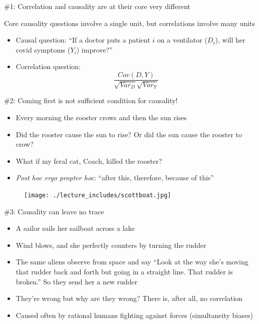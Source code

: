 \documentclass{beamer}
\begin{document}
\begin{frame}{\#1: Correlation and causality are at their core very different}

  Core causality questions involve a single unit, but correlations involve many units
  \begin{itemize}
    \item Causal question: ``If a doctor puts a patient $i$ on a ventilator ($D_i$), will her covid symptoms ($Y_i$) improve?''
    \item Correlation question:  $$\frac{Cov(D,Y)}{\sqrt{Var_D}\sqrt{{Var_Y}}}$$
  \end{itemize}

\end{frame}


\begin{frame}{\#2: Coming first is not sufficient condition for causality!}

  \begin{itemize}
    \item Every morning the rooster crows and then the sun rises
    \item Did the rooster cause the sun to rise? Or did the sun cause the rooster to crow?
    \item What if my feral cat, Coach, killed the rooster?
    \item \emph{Post hoc ergo propter hoc}: ``after this, therefore, because of this''
  \end{itemize}

\end{frame}

\begin{frame}[plain]

  \begin{figure}
    \centering
    \texttt{[image: ./lecture\_includes/scottboat.jpg]}
  \end{figure}

\end{frame}

\begin{frame}{\#3: Causality can leave no trace}

  \begin{itemize}
    \item A sailor sails her sailboat across a lake
    \item Wind blows, and she perfectly counters by turning the rudder
    \item The same aliens observe from space and say ``Look at the way she's moving that rudder back and forth but going in a straight line.  That rudder is broken.'' So they send her a new rudder
    \item They're wrong but why are they wrong? There is, after all, no correlation
    \item Caused often by rational humans fighting against forces (simultaneity biases)
  \end{itemize}

\end{frame}
\end{document}
